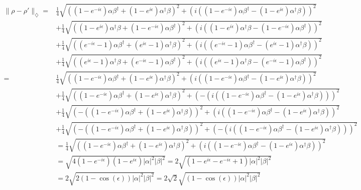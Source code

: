 \begin{equation}
  \begin{split}
    \lVert \rho-\rho' \rVert_{\diamondsuit} = &\frac{1}{4} \sqrt{((1-e^{-i\epsilon})\alpha \beta^{\dag}  + (1-e^{i\epsilon})\alpha^{\dag} \beta)^{2} + (i ((1-e^{-i\epsilon})\alpha \beta^{\dag}-(1-e^{i\epsilon})\alpha^{\dag} \beta))^{2}} \\
    & + \frac{1}{4} \sqrt{((1-e^{i\epsilon}) \alpha^{\dag} \beta + (1-e^{-i\epsilon}) \alpha \beta^{\dag})^{2} + (i ((1-e^{i\epsilon}) \alpha^{\dag} \beta - (1-e^{-i\epsilon}) \alpha \beta^{\dag}))^{2}} \\
    & + \frac{1}{4} \sqrt{((e^{-i\epsilon}-1) \alpha \beta^{\dag}  + (e^{i\epsilon}-1) \alpha^{\dag} \beta)^{2} + (i((e^{-i\epsilon}-1) \alpha \beta^{\dag}  - (e^{i\epsilon}-1) \alpha^{\dag} \beta))^{2}} \\
    & + \frac{1}{4} \sqrt{((e^{i\epsilon}-1) \alpha^{\dag} \beta  + (e^{-i\epsilon}-1) \alpha \beta^{\dag})^{2} + (i((e^{i\epsilon}-1) \alpha^{\dag} \beta  - (e^{-i\epsilon}-1) \alpha \beta^{\dag}))^{2}} \\
    = & \frac{1}{4} \sqrt{((1-e^{-i\epsilon})\alpha \beta^{\dag}  + (1-e^{i\epsilon})\alpha^{\dag} \beta)^{2} + (i ((1-e^{-i\epsilon})\alpha \beta^{\dag}-(1-e^{i\epsilon})\alpha^{\dag} \beta))^{2}} \\ 
    & +\frac{1}{4} \sqrt{((1-e^{-i\epsilon})\alpha \beta^{\dag}  + (1-e^{i\epsilon})\alpha^{\dag} \beta)^{2} + (-(i ((1-e^{-i\epsilon})\alpha \beta^{\dag}-(1-e^{i\epsilon})\alpha^{\dag} \beta)))^{2}}\\
    & +  \frac{1}{4} \sqrt{(-((1-e^{-i\epsilon})\alpha \beta^{\dag}  + (1-e^{i\epsilon})\alpha^{\dag} \beta))^{2} + (i ((1-e^{-i\epsilon})\alpha \beta^{\dag}-(1-e^{i\epsilon})\alpha^{\dag} \beta))^{2}} \\
    & + \frac{1}{4} \sqrt{(-((1-e^{-i\epsilon})\alpha \beta^{\dag}  + (1-e^{i\epsilon})\alpha^{\dag} \beta))^{2} + (-(i ((1-e^{-i\epsilon})\alpha \beta^{\dag}-(1-e^{i\epsilon})\alpha^{\dag} \beta)))^{2}}\\
    &=  \frac{1}{4} \sqrt{((1-e^{-i\epsilon})\alpha \beta^{\dag}  + (1-e^{i\epsilon})\alpha^{\dag} \beta)^{2} + (i ((1-e^{-i\epsilon})\alpha \beta^{\dag}-(1-e^{i\epsilon})\alpha^{\dag} \beta))^{2}}\\
    &=  \sqrt{4(1-e^{-i\epsilon})(1-e^{i\epsilon})|\alpha|^{2}|\beta|^{2}} = 2 \sqrt{(1-e^{i\epsilon}-e^{-i\epsilon}+1)|\alpha|^{2}|\beta|^{2}} \\
    &= 2\sqrt{2(1-\cos(\epsilon))|\alpha|^{2}|\beta|^{2}} = 2\sqrt{2} \sqrt{(1-\cos(\epsilon))|\alpha|^{2}|\beta|^{2}} \\
  \end{split}
\end{equation}

